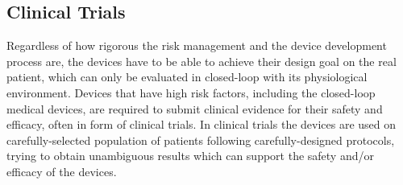 \subsection{Clinical Trials}
Regardless of how rigorous the risk management and the device development process are, the devices have to be able to achieve their design goal on the real patient, which can only be evaluated in closed-loop with its physiological environment. Devices that have high risk factors, including the closed-loop medical devices, are required to submit clinical evidence for their safety and efficacy, often in form of clinical trials. In clinical trials the devices are used on carefully-selected population of patients following carefully-designed protocols, trying to obtain unambiguous results which can support the safety and/or efficacy of the devices. 



